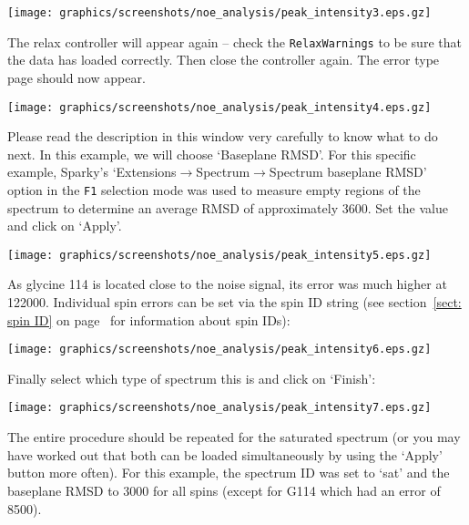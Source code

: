 \begin{minipage}[h]{\linewidth}
\centerline{\texttt{[image: graphics/screenshots/noe\_analysis/peak\_intensity3.eps.gz]}}
\end{minipage}

The relax controller will appear again -- check the \texttt{RelaxWarnings} to be sure that the data has loaded correctly.  Then close the controller again.  The error type page should now appear.

\begin{minipage}[h]{\linewidth}
\centerline{\texttt{[image: graphics/screenshots/noe\_analysis/peak\_intensity4.eps.gz]}}
\end{minipage}

Please read the description in this window very carefully to know what to do next.  In this example, we will choose `Baseplane RMSD'.  For this specific example, Sparky's `Extensions$\to$Spectrum$\to$Spectrum baseplane RMSD' option in the \texttt{F1} selection mode was used to measure empty regions of the spectrum to determine an average RMSD of approximately 3600.  Set the value and click on `Apply'.

\begin{minipage}[h]{\linewidth}
\centerline{\texttt{[image: graphics/screenshots/noe\_analysis/peak\_intensity5.eps.gz]}}
\end{minipage}

As glycine 114 is located close to the noise signal, its error was much higher at 122000.  Individual spin errors can be set via the spin ID string (see section~\ref{sect: spin ID} on page~\pageref{sect: spin ID} for information about spin IDs):

\begin{minipage}[h]{\linewidth}
\centerline{\texttt{[image: graphics/screenshots/noe\_analysis/peak\_intensity6.eps.gz]}}
\end{minipage}

Finally select which type of spectrum this is and click on `Finish':

\begin{minipage}[h]{\linewidth}
\centerline{\texttt{[image: graphics/screenshots/noe\_analysis/peak\_intensity7.eps.gz]}}
\end{minipage}

The entire procedure should be repeated for the saturated spectrum (or you may have worked out that both can be loaded simultaneously by using the `Apply' button more often).  For this example, the spectrum ID was set to `sat' and the baseplane RMSD to 3000 for all spins (except for G114 which had an error of 8500).


